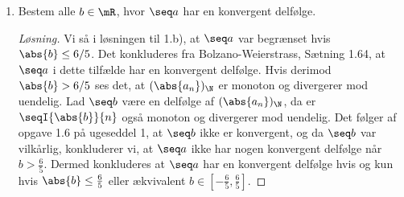 \begin{opg}
\begin{enumerate}
    
    \item Bestem alle $b\in\mR$, hvor $\seq a$ har en konvergent delfølge.
    \ifanswers \begin{proof}[Løsning]
    	Vi så i løsningen til 1.b), at $ \seq a $ var begrænset hvis $ \abs{b}\leq 6/5 $. Det konkluderes fra Bolzano-Weierstrass, Sætning 1.64, at $ \seq a $ i dette tilfælde har en konvergent delfølge. Hvis derimod $ \abs{b}>6/5 $ ses det, at $ (\abs{a_n})_{\N} $ er monoton og divergerer mod uendelig. Lad $ \seq b $ være en delfølge af $ (\abs{a_n})_{\N} $, da er $ \seqI{\abs{b}}{n} $ også monoton og divergerer mod uendelig. Det følger af opgave 1.6 på ugeseddel 1, at $ \seq b $ ikke er konvergent, og da $ \seq b $ var vilkårlig, konkluderer vi, at $ \seq a $ ikke har nogen konvergent delfølge når $ b>\frac{6}{5} $. Dermed konkluderes at $ \seq a $ har en konvergent delfølge hvis og kun hvis $ \abs{b}\leq \frac{6}{5} $ eller ækvivalent $ b\in\left[-\frac{6}{5},\frac{6}{5}\right] $. 
    \end{proof} \fi

\end{enumerate}
\end{opg}
